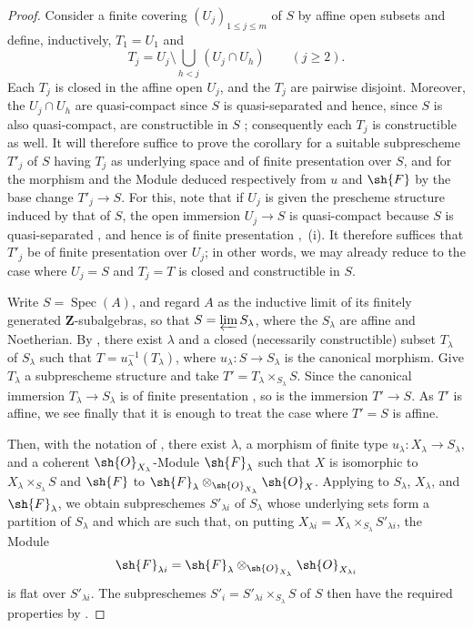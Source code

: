 \begin{proof}
Consider a finite covering $(U_j)_{1\leqslant j\leqslant m}$ of $S$ by affine open subsets and define, inductively, $T_1=U_1$ and
\[
T_j=U_j\setminus\bigcup_{h<j}(U_j\cap U_h)\qquad(j\geqslant 2).
\]
Each $T_j$ is closed in the affine open $U_j$, and the $T_j$ are pairwise disjoint.
Moreover, the $U_j\cap U_h$ are quasi-compact since $S$ is quasi-separated and hence, since $S$ is also quasi-compact, are constructible in $S$ ; consequently each $T_j$ is constructible as well.
It will therefore suffice to prove the corollary for a suitable subprescheme $T'_j$ of $S$ having $T_j$ as underlying space and of finite presentation over $S$, and for the morphism and the Module deduced respectively from $u$ and $\sh{F}$ by the base change $T'_j\to S$.
For this, note that if $U_j$ is given the prescheme structure induced by that of $S$, the open immersion $U_j\to S$ is quasi-compact because $S$ is quasi-separated , and hence is of
finite presentation ,~(i).
It therefore suffices that $T'_j$ be of finite presentation over $U_j$; in other words, we may already reduce to the case where $U_j=S$ and $T_j=T$ is closed and constructible in $S$.

Write $S=\operatorname{Spec}(A)$, and regard $A$ as the inductive limit of its finitely generated $\mathbf{Z}$-subalgebras, so that $S=\varprojlim S_\lambda$, where the $S_\lambda$ are affine and Noetherian.
By , there exist $\lambda$ and a closed (necessarily constructible) subset $T_\lambda$ of $S_\lambda$ such that $T=u_\lambda^{-1}(T_\lambda)$, where $u_\lambda:S\to S_\lambda$ is the canonical morphism.
Give $T_\lambda$ a subprescheme structure and take $T'=T_\lambda\times_{S_\lambda}S$.
Since the canonical immersion $T_\lambda\to S_\lambda$ is of finite presentation , so is the immersion $T'\to S$.
As $T'$ is affine, we see finally that it is enough to treat the case where $T'=S$ is affine.

Then, with the notation of , there exist $\lambda$, a morphism of finite type $u_\lambda:X_\lambda\to S_\lambda$, and a coherent $\sh{O}_{X_\lambda}$-Module $\sh{F}_\lambda$ such that $X$ is isomorphic to $X_\lambda\times_{S_\lambda}S$ and $\sh{F}$ to $\sh{F}_\lambda\otimes_{\sh{O}_{X_\lambda}}\sh{O}_X$.
Applying  to $S_\lambda$, $X_\lambda$, and $\sh{F}_\lambda$, we obtain subpreschemes $S'_{\lambda i}$ of $S_\lambda$ whose underlying sets form a partition of $S_\lambda$ and which are such that, on putting $X_{\lambda i}=X_\lambda\times_{S_\lambda}S'_{\lambda i}$, the Module
\[
\sh{F}_{\lambda i}=\sh{F}_\lambda\otimes_{\sh{O}_{X_\lambda}}\sh{O}_{X_{\lambda i}}
\]
is flat over $S'_{\lambda i}$.
The subpreschemes $S'_i=S'_{\lambda i}\times_{S_\lambda}S$ of $S$ then have the required properties by .
\end{proof}


